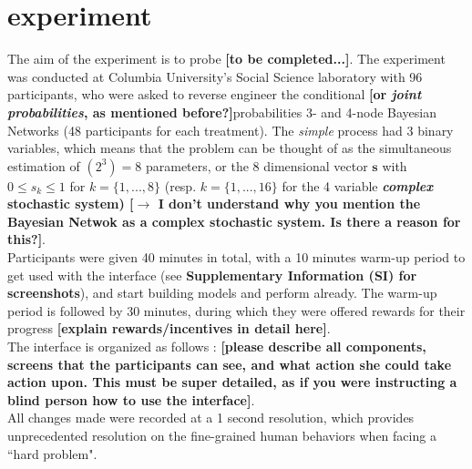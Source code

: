\section{experiment}

The aim of the experiment is to probe {\bf [to be completed...]}. The experiment was conducted at Columbia University's Social Science laboratory with 96 participants, who were asked to reverse engineer the conditional {\bf [or {\it joint probabilities}, as mentioned before?]}probabilities 3- and 4-node Bayesian Networks (48 participants for each treatment). The {\it simple} process had 3 binary variables, which means that the problem can be thought of as the simultaneous estimation of $(2^3) = 8$ parameters, or the 8 dimensional vector $\mathbf{s}$ with $0 \leqslant s_k  \leqslant 1$ for $k = \{1,...,8\}$ (resp. $k = \{1,..., 16\}$ for the 4 variable {\bf {\it complex} stochastic system) [$\rightarrow$ I don't understand why you mention the Bayesian Netwok as a complex stochastic system. Is there a reason for this?]}.\\

Participants were given 40 minutes in total, with a 10 minutes warm-up period to get used with the interface (see {\bf Supplementary Information (SI) for screenshots}), and start building models and perform already. The warm-up period is followed by 30 minutes, during which they were offered rewards for their progress {\bf [explain rewards/incentives in detail here]}. \\

The interface is organized as follows : {\bf [please describe all components, screens that the participants can see, and what action she could take action upon. This must be super detailed, as if you were instructing a blind person how to use the interface]}.\\

All changes made were recorded at a 1 second resolution, which provides unprecedented resolution on the fine-grained human behaviors when facing a ``hard problem".\\